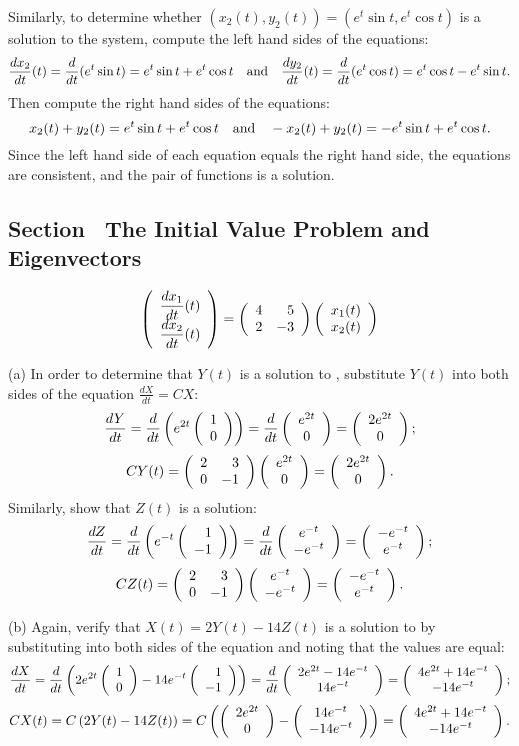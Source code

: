 \documentclass{ximera}
\begin{document}
\para Similarly, to determine whether $(x_2(t),y_2(t)) =
(e^t\sin{t},e^t\cos{t})$ is a solution to the system, compute the left
hand sides of the equations:
\[
\frac{dx_2}{dt}(t) = \frac{d}{dt}(e^t\sin{t}) = 
e^t\sin{t} + e^t\cos{t} \quad\mbox{and}\quad
\frac{dy_2}{dt}(t) = \frac{d}{dt}(e^t\cos{t}) =
e^t\cos{t} - e^t\sin{t}.
\]
Then compute the right hand sides of the equations:
\[
x_2(t) + y_2(t) = e^t\sin{t} + e^t\cos{t} \quad\mbox{and}\quad
-x_2(t) + y_2(t) = -e^t\sin{t} + e^t\cos{t}.
\]
Since the left hand side of each equation equals the right hand side, the
equations are consistent, and the pair of functions is a solution.



\subsection*{Section~\protect{\ref{S:IVP&E}} The Initial Value Problem and
Eigenvectors}

\arraystart
\[
\left(\begin{array}{r} \displaystyle\frac{dx_1}{dt}(t) \\ 
\displaystyle\frac{dx_2}{dt}(t)\end{array}\right) =
\left(\begin{array}{rr} 4 & 5 \\ 2 & -3\end{array}\right)
\left(\begin{array}{r} x_1(t) \\ x_2(t)\end{array}\right)
\]
\arrayfinish

(a) In order to determine that $Y(t)$ is a solution
to , substitute $Y(t)$ into both sides of the 
equation $\frac{dX}{dt} = CX$:
\[
\frac{dY}{dt}
= \frac{d}{dt}\left(e^{2t}\left(\begin{array}{r} 1 \\ 0\end{array}\right)\right)
= \frac{d}{dt}\left(\begin{array}{c} e^{2t} \\ 0\end{array}\right)
= \left(\begin{array}{c} 2e^{2t} \\ 0\end{array}\right);
\]
\[
CY(t)
= \left(\begin{array}{rr} 2 & 3\\ 0 &-1\end{array}\right)\left(\begin{array}{c} e^{2t} \\ 0\end{array}\right)
= \left(\begin{array}{c} 2e^{2t} \\ 0\end{array}\right).
\]
Similarly, show that $Z(t)$ is a solution:
\[
\frac{dZ}{dt}
= \frac{d}{dt}\left(e^{-t}\left(\begin{array}{r} 1 \\ -1\end{array}\right)\right)
= \frac{d}{dt}\left(\begin{array}{c} e^{-t} \\ -e^{-t}\end{array}\right)
= \left(\begin{array}{c} -e^{-t} \\ e^{-t}\end{array}\right);
\]
\[
CZ(t)
= \left(\begin{array}{rr} 2 & 3\\ 0 &-1\end{array}\right)\left(\begin{array}{c} e^{-t} \\ -e^{-t}\end{array}\right)
= \left(\begin{array}{c} -e^{-t} \\ e^{-t}\end{array}\right).
\]

(b) Again, verify that $X(t) = 2Y(t) - 14Z(t)$ is a solution to
 by substituting into both sides of the equation and
noting that the values are equal:
\[
\frac{dX}{dt}
= \frac{d}{dt}\left(2e^{2t}\left(\begin{array}{r} 1 \\ 0\end{array}\right) - 14e^{-t}\left(\begin{array}{r} 1 \\ -1\end{array}\right)\right)
= \frac{d}{dt}\left(\begin{array}{c} 2e^{2t} - 14e^{-t} \\ 14e^{-t}\end{array}\right) 
= \left(\begin{array}{c} 4e^{2t} + 14e^{-t} \\ -14e^{-t}\end{array}\right);
\]
\[
CX(t) = C\left(2Y(t) - 14Z(t)\right)
= C\left(\left(\begin{array}{c} 2e^{2t} \\ 0\end{array}\right) - \left(\begin{array}{c} 14e^{-t} \\ -14e^{-t}\end{array}\right)\right)
= \left(\begin{array}{c} 4e^{2t} + 14e^{-t} \\ -14e^{-t}\end{array}\right).
\]
\end{document}
